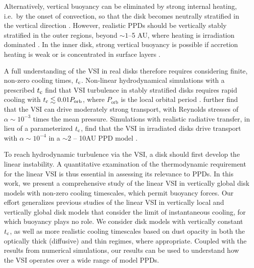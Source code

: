 \documentclass[iop]{emulateapj}
\begin{document}
Alternatively, vertical buoyancy can be eliminated by strong internal
heating, i.e.\ by the onset of convection, so that the disk becomes 
neutrally stratified in the vertical direction
. However, realistic PPDs should be vertically
stably stratified in the outer regions, beyond $\sim 1$--5 AU, where
heating is  irradiation dominated \citep{bitsch15}.  In the inner
disk, strong vertical buoyancy is possible if accretion heating is
weak or is concentrated in surface layers \citep{gammie96,lesniak11}.  

A full understanding of the VSI in real disks therefore requires
considering finite, non-zero cooling times, $t_{\rm c}$. Non-linear
hydrodynamical simulations with a prescribed  $t_{\rm c}$ find that VSI
turbulence in stably stratified disks requires rapid cooling  
with $t_{\rm c} \lesssim 0.01P_{\mathrm{orb}}$, where $P_\mathrm{orb}$ 
is the local orbital period %
 .  further find
that the VSI can drive moderately strong transport, with Reynolds
stresses of $\alpha \sim 10^{-3}$ times the mean pressure. Simulations
with realistic radiative transfer, in lieu of a parameterized $t_{\rm
  c}$, find that the VSI in irradiated disks drive transport with
$\alpha \sim 10^{-4}$  in a  $\sim 2$ -- 10AU PPD model \citep{stoll14}.  

To reach hydrodynamic turbulence via the VSI, a disk should  
first develop the linear instability. A quantitative 
examination of the thermodynamic requirement for the linear VSI is
thus essential in assessing its 
relevance to PPDs. In this work, we present a
comprehensive study of the linear VSI in vertically global disk models 
with non-zero cooling timescales, which permit buoyancy forces. 
Our effort generalizes previous studies of the linear VSI in 
vertically local \citep{urpin98,urpin03} and vertically global 
 disk models that consider the limit
of instantaneous cooling, for which buoyancy plays no role.  
We consider disk  
models with vertically constant $t_{\rm c}$, as well as more realistic
cooling timescales based on dust opacity in both the optically thick
(diffusive) and thin regimes, where appropriate. Coupled with the 
results from numerical simulations, our results can be used to 
understand how the VSI operates over a wide range of model PPDs. 
\end{document}
